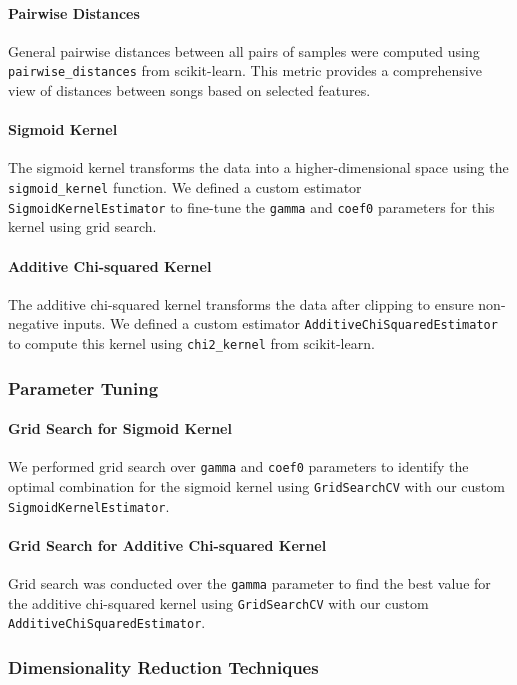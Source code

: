 \documentclass[a4paper, 24pt]{article}
\begin{document}
\paragraph{Pairwise Distances}
General pairwise distances between all pairs of samples were computed using \texttt{pairwise\_distances} from scikit-learn. This metric provides a comprehensive view of distances between songs based on selected features.

\paragraph{Sigmoid Kernel}
The sigmoid kernel transforms the data into a higher-dimensional space using the \texttt{sigmoid\_kernel} function. We defined a custom estimator \texttt{SigmoidKernelEstimator} to fine-tune the \texttt{gamma} and \texttt{coef0} parameters for this kernel using grid search.

\paragraph{Additive Chi-squared Kernel}
The additive chi-squared kernel transforms the data after clipping to ensure non-negative inputs. We defined a custom estimator \texttt{AdditiveChiSquaredEstimator} to compute this kernel using \texttt{chi2\_kernel} from scikit-learn.

\subsubsection{Parameter Tuning}

\paragraph{Grid Search for Sigmoid Kernel}
We performed grid search over \texttt{gamma} and \texttt{coef0} parameters to identify the optimal combination for the sigmoid kernel using \texttt{GridSearchCV} with our custom \texttt{SigmoidKernelEstimator}.

\paragraph{Grid Search for Additive Chi-squared Kernel}
Grid search was conducted over the \texttt{gamma} parameter to find the best value for the additive chi-squared kernel using \texttt{GridSearchCV} with our custom \texttt{AdditiveChiSquaredEstimator}.
\subsubsection{Dimensionality Reduction Techniques}
\end{document}
